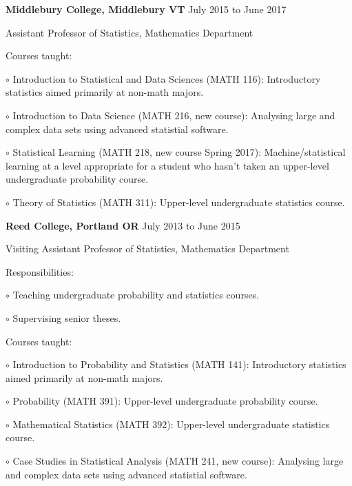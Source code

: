 \documentclass[10pt]{article}
\newcommand{\halfblankline}{\quad\vspace{-0.5\baselineskip}\pagebreak[3]}
\begin{document}
\halfblankline

\textbf{Middlebury College, Middlebury VT} \hfill {July 2015 to June 2017}
\begin{outerlist}
 	\item[] Assistant Professor of Statistics, Mathematics Department
    	\begin{innerlist}
		\item Courses taught:
		\begin{innerlist}
		\item[$\circ$] Introduction to Statistical and Data Sciences (MATH 116):  Introductory
		statistics aimed primarily at non-math majors.
		\item[$\circ$] Introduction to Data Science (MATH 216, new course): Analysing large and complex data sets using advanced statistial software.
		\item[$\circ$] Statistical Learning (MATH 218, new course Spring 2017): Machine/statistical learning at a level appropriate for a student who hasn't taken an upper-level undergraduate
		probability course.
		\item[$\circ$] Theory of Statistics (MATH 311): Upper-level undergraduate
		statistics course.
		\end{innerlist}
	\end{innerlist}
\end{outerlist}

\halfblankline

\textbf{Reed College, Portland OR} \hfill {July 2013 to June 2015}
\begin{outerlist}
 	\item[] Visiting Assistant Professor of Statistics, Mathematics Department
    \begin{innerlist}
     	\item Responsibilities:
		\begin{innerlist}
		\item[$\circ$] Teaching undergraduate probability and statistics courses.
		\item[$\circ$] Supervising senior theses.
		\end{innerlist}
		\item Courses taught:
		\begin{innerlist}
		\item[$\circ$] Introduction to Probability and Statistics (MATH 141):  Introductory
		statistics aimed primarily at non-math majors.
		\item[$\circ$] Probability (MATH 391): Upper-level undergraduate probability course.
		\item[$\circ$] Mathematical Statistics (MATH 392): Upper-level undergraduate statistics course.
		\item[$\circ$] Case Studies in Statistical Analysis (MATH 241, new course):  Analysing large and complex data sets using advanced statistial software.
	\end{innerlist}
    \end{innerlist}
\end{outerlist}
\end{document}
